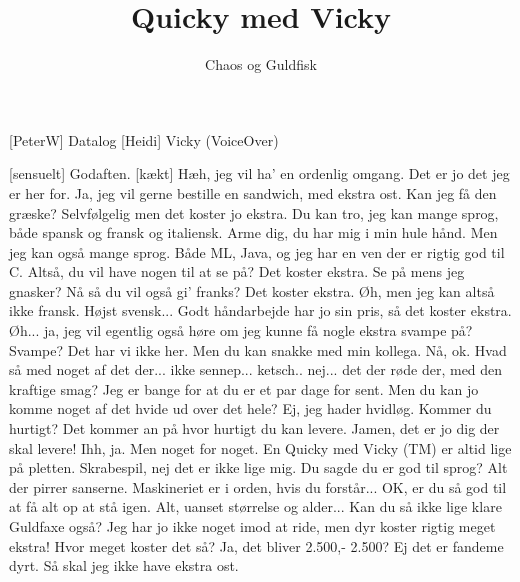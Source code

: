 \documentclass[a4paper,11pt]{article}
\title{Quicky med Vicky}
\author{Chaos og Guldfisk}
\begin{document}
\maketitle

\begin{roles}
[PeterW] Datalog
[Heidi] Vicky (VoiceOver)
\end{roles}

\begin{props}
\end{props}

  
\begin{sketch}


 [sensuelt] Godaften. 
 [kækt] Hæh, jeg vil ha' en ordenlig omgang.
 Det er jo det jeg er her for. 
 Ja, jeg vil gerne bestille en sandwich, med ekstra ost. Kan jeg få den
græske?
 Selvfølgelig men det koster jo ekstra. Du kan tro, jeg kan mange sprog,
både spansk og fransk og italiensk.
 Arme dig, du har mig i min hule hånd. Men jeg kan også mange sprog.
Både ML, Java, og jeg har en ven der er rigtig god til C.
 Altså, du vil have nogen til at se på? Det koster ekstra.
 Se på mens jeg gnasker?
 Nå så du vil også gi' franks? Det koster ekstra.
 Øh, men jeg kan altså ikke fransk. Højst svensk...
 Godt håndarbejde har jo sin pris, så det koster ekstra.
 Øh... ja, jeg vil egentlig også høre om jeg kunne få nogle ekstra
svampe på?
 Svampe? Det har vi ikke her. Men du kan snakke med min kollega.
 Nå, ok. Hvad så med noget af det der... ikke sennep... ketsch.. nej... det
der røde der, med den kraftige smag?
 Jeg er bange for at du er et par dage for sent. Men du kan jo komme
noget af det hvide ud over det hele?
 Ej, jeg hader hvidløg. Kommer du hurtigt?
 Det kommer an på hvor hurtigt du kan levere.
 Jamen, det er jo dig der skal levere!
 Ihh, ja. Men noget for noget. En Quicky med Vicky (TM) er altid lige på
pletten.
 Skrabespil, nej det er ikke lige mig. Du sagde du er god til sprog?
 Alt der pirrer sanserne. Maskineriet er i orden, hvis du forstår...
 OK, er du så god til at få alt op at stå igen.
 Alt, uanset størrelse og alder...
 Kan du så ikke lige klare Guldfaxe også?
 Jeg har jo ikke noget imod at ride, men dyr koster rigtig meget
ekstra!
 Hvor meget koster det så?
 Ja, det bliver 2.500,-
 2.500? Ej det er fandeme dyrt. Så skal jeg ikke have ekstra ost.




\end{sketch}
\end{document}
